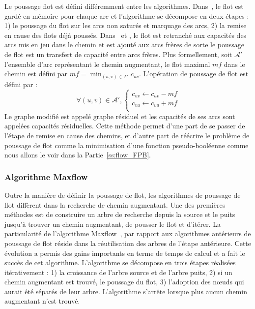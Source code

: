\documentclass[../main/These_Mathias_Paget.tex]{subfiles}
\begin{document}
	Le poussage flot est défini différemment entre les algorithmes. Dans~\cite{Ford62book}, le flot est gardé en mémoire pour chaque arc et l'algorithme se décompose en deux étapes : 1) le poussage du flot sur les arcs non saturés et marquage des arcs, 2) la remise en cause des flots déjà poussés. Dans~\cite{Boros2014} et \cite{Boykov04PAMI}, le flot est retranché aux capacités des arcs mis en jeu dans le chemin et est ajouté aux arcs frères de sorte le poussage de flot est un transfert de capacité entre arcs frères. Plus formellement, soit $\boldsymbol{\mathcal{A}'}$ l'ensemble d'arc représentant le chemin augmentant, le flot maximal $mf$ dans le chemin est défini par $mf = \min_{(u,v) \in A'}{c_{uv}}$. L'opération de poussage de flot est défini par :
	\begin{equation}
		\forall (u,v) \in  \boldsymbol{\mathcal{A}'}, \left\{
		\begin{aligned}
			c_{uv} \leftarrow c_{uv}-mf \\
			c_{vu} \leftarrow c_{vu}+mf \\
		\end{aligned}
		\right.
	\end{equation}	
Le graphe modifié est appelé graphe résiduel et les capacités de ses arcs sont appelées capacités résiduelles. Cette méthode permet d'une part de se passer de l'étape de remise en cause des chemins, et d'autre part de réécrire le problème de poussage de flot comme la minimisation d'une fonction pseudo-booléenne comme nous allons le voir dans la Partie~\ref{ss:flow_FPB}.

\subsubsection{Algorithme Maxflow}
	Outre la manière de définir la poussage de flot, les algorithmes de poussage de flot diffèrent dans la recherche de chemin augmentant. Une des premières méthodes est de construire un arbre de recherche depuis la source et le puits jusqu'à trouver un chemin augmentant, de pousser le flot et d'itérer. La particularité de l'algorithme Maxflow~\citep{Boykov04PAMI}, \citep{Kolmogorov14IPOL} par rapport aux algorithmes antérieurs de poussage de flot réside dans la réutilisation des arbres de l'étape antérieure. Cette évolution a permis des gains importants en terme de temps de calcul et a fait le succès de cet algorithme. L'algorithme se décompose en trois étapes réalisées itérativement : 1) la croissance de l'arbre source et de l'arbre puits, 2) si un chemin augmentant est trouvé, le poussage du flot, 3) l'adoption des nœuds qui aurait été séparés de leur arbre. L'algorithme s’arrête lorsque plus aucun chemin augmentant n'est trouvé.
\end{document}
